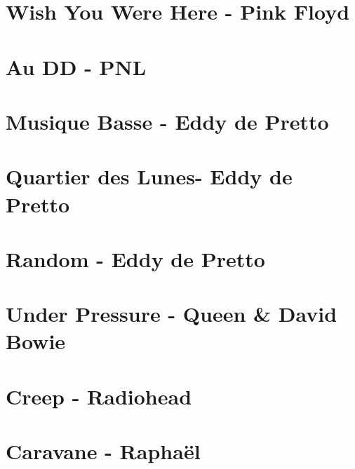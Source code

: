 \documentclass[11pt]{article}
\begin{document}
\section{Wish You Were Here - Pink Floyd}
\begin{guitar}

\end{guitar}


\section{Au DD - PNL}




\section{Musique Basse - Eddy de Pretto}
\begin{guitar}

\end{guitar}

\section{Quartier des Lunes- Eddy de Pretto}
\begin{guitar}

\end{guitar}

\section{Random - Eddy de Pretto}
\begin{guitar}

\end{guitar}

\section{Under Pressure - Queen \& David Bowie}
\begin{guitar}

\end{guitar}

\section{Creep - Radiohead}
\begin{guitar}

\end{guitar}

\section{Caravane - Raphaël}
\begin{guitar}

\end{guitar}
\end{document}
